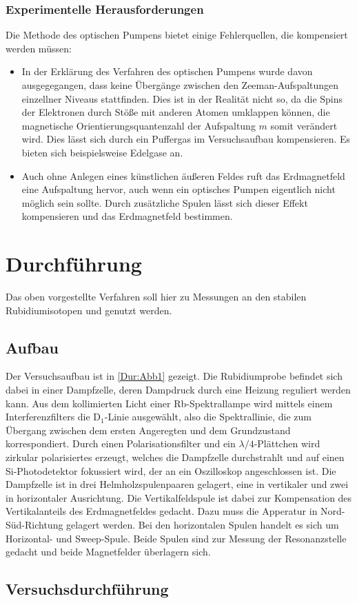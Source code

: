 \subsubsection{Experimentelle Herausforderungen}
Die Methode des optischen Pumpens bietet einige Fehlerquellen, die kompensiert werden
müssen:
\begin{itemize}
  \item In der Erklärung des Verfahren des optischen Pumpens wurde davon ausgegegangen,
  dass keine Übergänge zwischen den Zeeman-Aufspaltungen einzellner Niveaus
  stattfinden.
  Dies ist in der Realität nicht so, da die Spins der Elektronen durch Stöße mit
  anderen Atomen umklappen können, die magnetische Orientierungsquantenzahl der
  Aufspaltung $m$ somit verändert wird.
  Dies lässt sich durch ein Puffergas im Versuchsaufbau kompensieren.
  Es bieten sich beispielsweise Edelgase an.
  \item Auch ohne Anlegen eines künstlichen äußeren
  Feldes ruft das Erdmagnetfeld eine Aufspaltung hervor, auch wenn ein optisches
  Pumpen eigentlich nicht möglich sein sollte.
  Durch zusätzliche Spulen lässt sich dieser Effekt kompensieren und das Erdmagnetfeld
  bestimmen.
\end{itemize}

\section{Durchführung}
Das oben vorgestellte Verfahren soll hier zu Messungen an den stabilen Rubidiumisotopen
 und  genutzt werden.
\subsection{Aufbau}
Der Versuchsaufbau ist in \autoref{Dur:Abb1} gezeigt.
Die Rubidiumprobe befindet sich dabei in einer Dampfzelle, deren Dampdruck durch eine
Heizung reguliert werden kann.
Aus dem kollimierten Licht einer Rb-Spektrallampe wird mittels einem Interferenzfilters die
D$_{1}$-Linie ausgewählt, also die Spektrallinie, die zum Übergang zwischen dem
ersten Angeregten und dem Grundzustand korrespondiert.
Durch einen Polarisationsfilter und ein $\lambda/4$-Plättchen wird zirkular polarisiertes
erzeugt, welches die Dampfzelle durchstrahlt und auf einen Si-Photodetektor
fokussiert wird, der an ein Oszilloskop angeschlossen ist.
Die Dampfzelle ist in drei Helmholzspulenpaaren gelagert, eine in vertikaler und
zwei in horizontaler Ausrichtung.
Die Vertikalfeldspule ist dabei zur Kompensation des Vertikalanteils des Erdmagnetfeldes
gedacht.
Dazu muss die Apperatur in Nord-Süd-Richtung gelagert werden.
Bei den horizontalen Spulen handelt es sich um Horizontal- und Sweep-Spule.
Beide Spulen sind zur Messung der Resonanzstelle gedacht und beide Magnetfelder überlagern
sich.

\subsection{Versuchsdurchführung}

